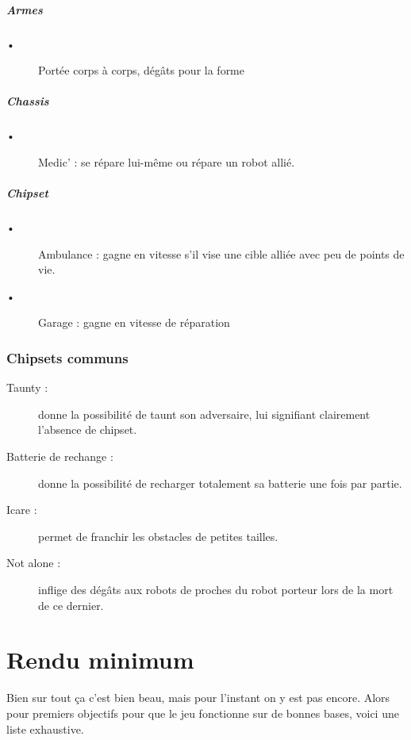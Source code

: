 \documentclass[10pt]{article}
\begin{document}
\subsubsection*{Armes}
\begin{description}
\item [•] Portée corps à corps, dégâts pour la forme
\end{description}

\subsubsection*{Chassis}
\begin{description}
\item [•] Medic' : se répare lui-même ou répare un robot allié.
\end{description}

\subsubsection*{Chipset}
\begin{description}
\item [•] Ambulance : gagne en vitesse s'il vise une cible alliée avec peu de points de vie.
\item [•] Garage : gagne en vitesse de réparation
\end{description}

\section{Chipsets communs}
\begin{description}
\item [Taunty :] donne la possibilité de taunt son adversaire, lui signifiant clairement l'absence de chipset.
\item [Batterie de rechange :] donne la possibilité de recharger totalement sa batterie une fois par partie.
\item [Icare :] permet de franchir les obstacles de petites tailles.
\item [Not alone :] inflige des dégâts aux robots de proches du robot porteur lors de la mort de ce dernier.
\end{description}
\newpage
\setcounter{section}{0}
\part{Rendu minimum}
Bien sur tout ça c'est bien beau, mais pour l'instant on y est pas encore. Alors pour premiers objectifs pour que le jeu fonctionne sur de bonnes bases, voici une liste exhaustive.
\end{document}
